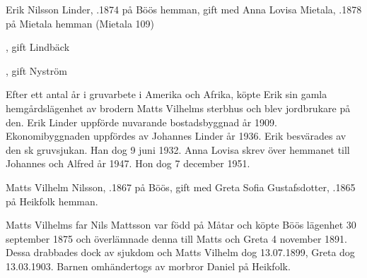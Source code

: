 Erik Nilsson Linder, .1874 på Böös hemman, gift med Anna Lovisa Mietala, .1878 på Mietala hemman (Mietala 109)
\begin{jhchildren}
  \item {}
  \item {}, gift Lindbäck
  \item {}
  \item {}, gift Nyström
  \item {}
  \item {}
  \item {}
  \item {}
  \item {}
\end{jhchildren}
Efter ett antal år i gruvarbete i Amerika och Afrika, köpte  Erik sin gamla hemgårdslägenhet av brodern Matts Vilhelms sterbhus och blev jordbrukare på den. Erik Linder uppförde nuvarande bostadsbyggnad år 1909. Ekonomibyggnaden uppfördes av Johannes Linder år 1936. Erik besvärades  av den sk gruvsjukan. Han  dog 9 juni 1932. Anna Lovisa skrev över hemmanet till Johannes och Alfred år 1947. Hon dog 7 december 1951.


Matts Vilhelm Nilsson, .1867 på Böös, gift med Greta Sofia Gustafsdotter, .1865 på Heikfolk hemman.
\begin{jhchildren}
  \item {}
  \item {}
  \item {}
  \item {}
\end{jhchildren}
Matts Vilhelms far Nils Mattsson var född på Måtar och köpte Böös lägenhet 30 september 1875 och överlämnade denna till Matts och Greta 4 november 1891. Dessa drabbades dock av sjukdom och Matts Vilhelm dog 13.07.1899, Greta dog 13.03.1903. Barnen omhändertogs av morbror Daniel på Heikfolk.


